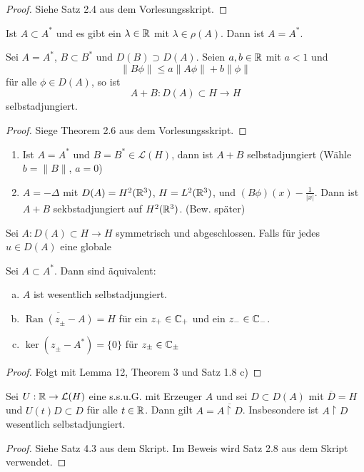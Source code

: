 \documentclass{mycourse}
\newcommand{\Ran}{\operatorname{Ran}}
\begin{document}
\begin{proof}
Siehe Satz 2.4 aus dem Vorlesungsskript.
\end{proof}
\begin{kor}
Ist $A\subset A^*$ und es gibt ein $\lambda \in \mathbb{R}$ mit $\lambda \in\rho(A)$. Dann ist $A=A^*$.
\end{kor}
\begin{st}
Sei $A=A^*$, $B\subset B^*$ und $D(B) \supset D(A)$. Seien $a,b\in \mathbb{R}$ mit $a<1$ und
\[
\|B\phi\| \le a \| A\phi\| + b \| \phi \|
\]
für alle $\phi \in D(A)$, so ist
\[
A+B: D(A) \subset H  \to H
\]
selbstadjungiert.
\end{st}
\begin{proof}
Siege Theorem 2.6 aus dem Vorlesungsskript.
\end{proof}

\begin{ex*}
\begin{enumerate}[1)]
\item Ist $A=A^*$ und $B=B^*\in \mathcal L(H)$, dann ist $A+B$ selbstadjungiert (Wähle $b=\| B\|$, $a=0$)
\item $A=-\Delta$ mit $D(A) = H^2(\mathbb{R}^3)$, $H=L^2(\mathbb{R}^3)$, und $(B\phi)(x) -\frac{1}{|x|}$. Dann ist $A+B$ sekbstadjungiert auf $H^2(\mathbb{R}^3)$. (Bew. später)
\end{enumerate}
\end{ex*}


\begin{st}
Sei $A : D(A) \subset H \to H$ symmetrisch und abgeschlossen. Falls für jedes $u\in D(A)$ eine globale 
\end{st}






\setcounter{thm}{13}
\begin{st}
Sei $A\subset A^*$. Dann sind äquivalent:
\begin{enumerate}[a)]
\item $A$ ist wesentlich selbstadjungiert.
\item $\overline{\Ran(z_\pm -A)}=H$ für ein $z_+\in \mathbb{C}_+$ und ein $z_-\in \mathbb{C}_-$.
\item $\ker(z_\pm - A^*)= \{0\}$ für $z_\pm \in \mathbb{C}_\pm$
\end{enumerate}
\end{st}
\begin{proof}
Folgt mit Lemma 12, Theorem 3 und Satz 1.8 c)
\end{proof}

\begin{st}[Nelson]
Sei $U: \mathbb{R} \to \mathcal L(H)$ eine s.s.u.G. mit Erzeuger $A$ und sei $D\subset D(A)$ mit $\overline{D}=H$ und $U(t)D\subset D$ für alle $t\in \mathbb{R}$. Dann gilt $A=\overline{A \upharpoonright D}$. Insbesondere ist $A\upharpoonright D$ wesentlich selbstadjungiert.
\end{st}
\begin{proof}
Siehe Satz 4.3 aus dem Skript. Im Beweis wird Satz 2.8 aus dem Skript verwendet. 
\end{proof}
\end{document}

